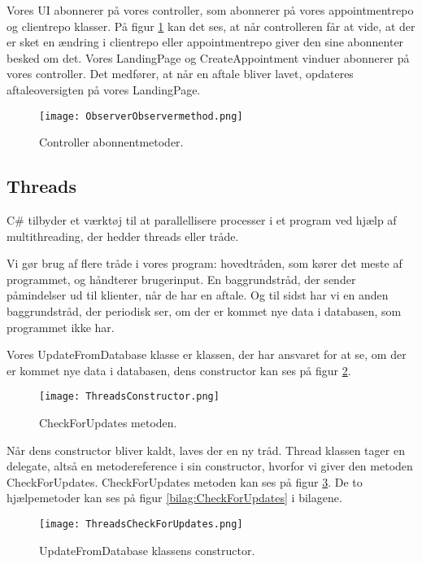 Vores UI abonnerer på vores controller, som abonnerer på vores appointmentrepo og clientrepo klasser.
På figur \ref{fig:ObserverObservermethod} kan det ses, at når controlleren får at vide, at der er sket en ændring i clientrepo eller appointmentrepo giver den sine abonnenter besked om det.
Vores LandingPage og CreateAppointment vinduer abonnerer på vores controller.
Det medfører, at når en aftale bliver lavet, opdateres aftaleoversigten på vores LandingPage.

\begin{figure}[h]
    \caption{Controller abonnentmetoder.}
    \centering
        \texttt{[image: ObserverObservermethod.png]}
    \label{fig:ObserverObservermethod}
\end{figure}

\subsection{Threads}
C\# tilbyder et værktøj til at parallellisere processer i et program ved hjælp af multithreading, der hedder threads eller tråde.

Vi gør brug af flere tråde i vores program: hovedtråden, som kører det meste af programmet, og håndterer brugerinput.
En baggrundstråd, der sender påmindelser ud til klienter, når de har en aftale.
Og til sidst har vi en anden baggrundstråd, der periodisk ser, om der er kommet nye data i databasen, som programmet ikke har.

Vores UpdateFromDatabase klasse er klassen, der har ansvaret for at se, om der er kommet nye data i databasen, dens constructor kan ses på figur \ref{fig:threadsConstructor}.

\begin{figure}[h]
    \caption{CheckForUpdates metoden.}
    \centering
        \texttt{[image: ThreadsConstructor.png]}
    \label{fig:threadsConstructor}
\end{figure}

Når dens constructor bliver kaldt, laves der en ny tråd.
Thread klassen tager en delegate, altså en metodereference i sin constructor, hvorfor vi giver den metoden CheckForUpdates.
CheckForUpdates metoden kan ses på figur \ref{fig:threadsUpdate}.
De to hjælpemetoder kan ses på figur \ref{bilag:CheckForUpdates} i bilagene.

\begin{figure}[H]
    \caption{UpdateFromDatabase klassens constructor.}
    \centering
        \texttt{[image: ThreadsCheckForUpdates.png]}
    \label{fig:threadsUpdate}
\end{figure}

